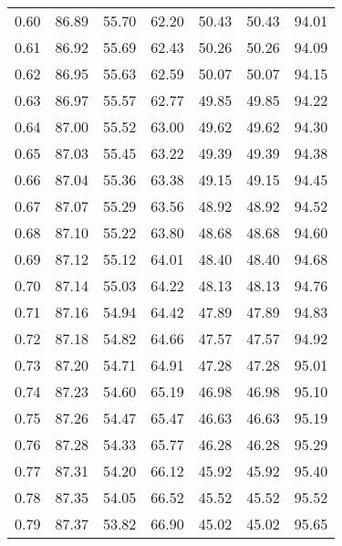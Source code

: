 \begin{tabular}{|c|c|c|c|c|c|c|}
      0.60 &     86.89 &     55.70 &      62.20 &   50.43 &      50.43 &         94.01 \\
      0.61 &     86.92 &     55.69 &      62.43 &   50.26 &      50.26 &         94.09 \\
      0.62 &     86.95 &     55.63 &      62.59 &   50.07 &      50.07 &         94.15 \\
      0.63 &     86.97 &     55.57 &      62.77 &   49.85 &      49.85 &         94.22 \\
      0.64 &     87.00 &     55.52 &      63.00 &   49.62 &      49.62 &         94.30 \\
      0.65 &     87.03 &     55.45 &      63.22 &   49.39 &      49.39 &         94.38 \\
      0.66 &     87.04 &     55.36 &      63.38 &   49.15 &      49.15 &         94.45 \\
      0.67 &     87.07 &     55.29 &      63.56 &   48.92 &      48.92 &         94.52 \\
      0.68 &     87.10 &     55.22 &      63.80 &   48.68 &      48.68 &         94.60 \\
      0.69 &     87.12 &     55.12 &      64.01 &   48.40 &      48.40 &         94.68 \\
      0.70 &     87.14 &     55.03 &      64.22 &   48.13 &      48.13 &         94.76 \\
      0.71 &     87.16 &     54.94 &      64.42 &   47.89 &      47.89 &         94.83 \\
      0.72 &     87.18 &     54.82 &      64.66 &   47.57 &      47.57 &         94.92 \\
      0.73 &     87.20 &     54.71 &      64.91 &   47.28 &      47.28 &         95.01 \\
      0.74 &     87.23 &     54.60 &      65.19 &   46.98 &      46.98 &         95.10 \\
      0.75 &     87.26 &     54.47 &      65.47 &   46.63 &      46.63 &         95.19 \\
      0.76 &     87.28 &     54.33 &      65.77 &   46.28 &      46.28 &         95.29 \\
      0.77 &     87.31 &     54.20 &      66.12 &   45.92 &      45.92 &         95.40 \\
      0.78 &     87.35 &     54.05 &      66.52 &   45.52 &      45.52 &         95.52 \\
      0.79 &     87.37 &     53.82 &      66.90 &   45.02 &      45.02 &         95.65 \\

\end{tabular}

